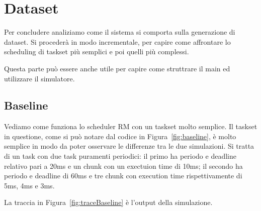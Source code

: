 \chapter{Dataset}
Per concludere analiziamo come il sistema si comporta sulla generazione di dataset. Si procederà in modo incrementale, per capire come affrontare lo scheduling di taskset più semplici e poi quelli più complessi.

Questa parte può essere anche utile per capire come struttrare il main ed utilizzare il simulatore.

\section{Baseline}
Vediamo come funziona lo scheduler RM con un taskset molto semplice. Il taskset in questione, come si può notare dal codice in Figura~\ref{fig:baseline}, è molto semplice in modo da poter osservare le differenze tra le due simulazioni. Si tratta di un task con due task puramenti periodici: il primo ha periodo e deadline relativo pari a 20ms e un chunk con un exectuion time di 10ms; il secondo ha periodo e deadline di 60ms e tre chunk con execution time rispettivamente di 5ms, 4ms e 3ms.

La traccia in Figura~\ref{fig:traceBaseline} è l'output della simulazione.

